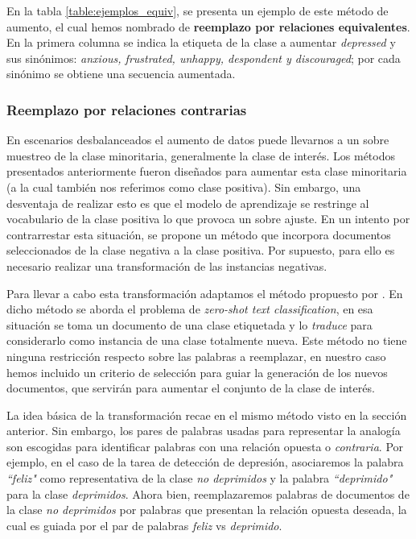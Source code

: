 En la tabla \ref{table:ejemplos_equiv}, se presenta un ejemplo de este método de aumento, el cual hemos nombrado de \textbf{reemplazo por relaciones equivalentes}.
En la primera columna se indica la etiqueta de la clase a aumentar \textit{depressed} y sus sinónimos: \textit{anxious, frustrated, unhappy, despondent y discouraged}; por cada sinónimo se obtiene una secuencia aumentada.




\subsubsection{Reemplazo por relaciones contrarias}

En escenarios desbalanceados el aumento de datos puede llevarnos a un sobre muestreo de la clase minoritaria, generalmente la clase de interés. Los métodos presentados anteriormente fueron diseñados para aumentar esta clase minoritaria (a la cual también nos referimos como clase positiva). Sin embargo, una desventaja de realizar esto es que el modelo de aprendizaje se restringe al vocabulario de la clase positiva lo que provoca un sobre ajuste. En un intento por contrarrestar esta situación, se propone un método que incorpora documentos seleccionados de la clase negativa a la clase positiva. Por supuesto, para ello es necesario realizar una transformación de las instancias negativas.

Para llevar a cabo esta transformación adaptamos el método propuesto por \citep{zhang2019integrating}. En dicho método se aborda el problema de  \textit{zero-shot text classification}, en esa situación se toma un documento de una clase etiquetada y lo \textit{traduce} para considerarlo como instancia de una clase totalmente nueva. Este método no tiene ninguna restricción respecto sobre las palabras a reemplazar, en nuestro caso hemos incluido un criterio de selección para guiar la generación de los nuevos documentos, que servirán para aumentar el conjunto de la clase de interés.   

La idea básica de la transformación recae en el mismo método visto en la sección anterior. Sin embargo, los pares de palabras usadas para representar la analogía son escogidas para identificar palabras con una relación opuesta o \textit{contraria}. Por ejemplo, en el caso de la tarea de detección de depresión, asociaremos la palabra \textit{``feliz"} como representativa de la clase \textit{no deprimidos}  y la palabra \textit{``deprimido"} para la clase \textit{deprimidos}. Ahora bien, reemplazaremos palabras de documentos de la clase \textit{no deprimidos} por palabras que presentan la relación opuesta deseada, la cual es guiada por el par de palabras \textit{feliz} vs \textit{deprimido}. 

